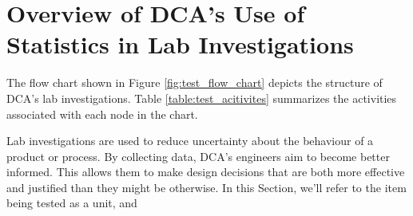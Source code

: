 \documentclass[11pt,a4paper,article]{memoir} %
\begin{document}







\newpage
\chapter {Overview of DCA's Use of Statistics in Lab Investigations}
The flow chart shown in Figure \ref{fig:test_flow_chart} depicts the structure of DCA's lab investigations. Table \ref{table:test_acitivites} summarizes the activities associated with each node in the chart.
\par
Lab investigations are used to reduce uncertainty about the behaviour of a product or process. By collecting data, DCA's engineers aim to become better informed. This allows them to make design decisions that are both more effective and justified than they might be otherwise. In this Section, we'll refer to the item being tested as a unit, and 
\end{document}

